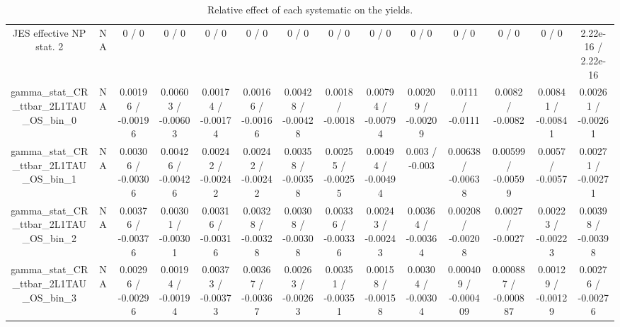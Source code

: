 \documentclass[10pt]{article}
\begin{document}
\begin{table}[htbp]
\begin{center}
\begin{tabular}{|c|c|c|c|c|c|c|c|c|c|c|c|c|c|}
  JES effective NP stat. 2 &    NA    & 0 / 0 & 0 / 0 & 0 / 0 & 0 / 0 & 0 / 0 & 0 / 0 & 0 / 0 & 0 / 0 & 0 / 0 & 0 / 0 & 0 / 0 & 2.22e-16 / 2.22e-16 \\ 
  gamma_stat_CR_ttbar_2L1TAU_OS_bin_0 &    NA    & 0.00196 / -0.00196 & 0.00603 / -0.00603 & 0.00174 / -0.00174 & 0.00166 / -0.00166 & 0.00428 / -0.00428 & 0.0018 / -0.0018 & 0.00794 / -0.00794 & 0.00209 / -0.00209 & 0.0111 / -0.0111 & 0.0082 / -0.0082 & 0.00841 / -0.00841 & 0.00261 / -0.00261 \\ 
  gamma_stat_CR_ttbar_2L1TAU_OS_bin_1 &    NA    & 0.00306 / -0.00306 & 0.00426 / -0.00426 & 0.00242 / -0.00242 & 0.00242 / -0.00242 & 0.00358 / -0.00358 & 0.00255 / -0.00255 & 0.00494 / -0.00494 & 0.003 / -0.003 & 0.00638 / -0.00638 & 0.00599 / -0.00599 & 0.0057 / -0.0057 & 0.00271 / -0.00271 \\ 
  gamma_stat_CR_ttbar_2L1TAU_OS_bin_2 &    NA    & 0.00376 / -0.00376 & 0.00301 / -0.00301 & 0.00316 / -0.00316 & 0.00328 / -0.00328 & 0.00308 / -0.00308 & 0.00336 / -0.00336 & 0.00243 / -0.00243 & 0.00364 / -0.00364 & 0.00208 / -0.00208 & 0.0027 / -0.0027 & 0.00223 / -0.00223 & 0.00398 / -0.00398 \\ 
  gamma_stat_CR_ttbar_2L1TAU_OS_bin_3 &    NA    & 0.00296 / -0.00296 & 0.00194 / -0.00194 & 0.00373 / -0.00373 & 0.00367 / -0.00367 & 0.00263 / -0.00263 & 0.00351 / -0.00351 & 0.00158 / -0.00158 & 0.00304 / -0.00304 & 0.000409 / -0.000409 & 0.000887 / -0.000887 & 0.00129 / -0.00129 & 0.00276 / -0.00276 \\ 
\hline 
\end{tabular} 
\caption{Relative effect of each systematic on the yields.} 
\end{center} 
\end{table} 
\end{document}

